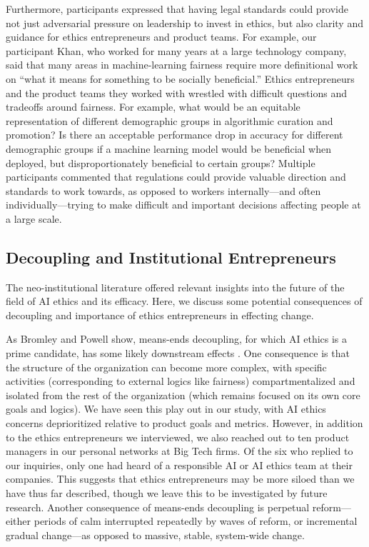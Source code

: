 \documentclass[sigconf]{acmart}
\begin{document}
Furthermore, participants expressed that having legal standards could provide not just adversarial pressure on leadership to invest in ethics, but also clarity and guidance for ethics entrepreneurs and product teams. For example, our participant Khan, who worked for many years at a large technology company, said that many areas in machine-learning fairness require more definitional work on “what it means for something to be socially beneficial.” Ethics entrepreneurs and the product teams they worked with wrestled with difficult questions and tradeoffs around fairness. For example, what would be an equitable representation of different demographic groups in algorithmic curation and promotion? Is there an acceptable performance drop in accuracy for different demographic groups if a machine learning model would be beneficial when deployed, but disproportionately beneficial to certain groups? Multiple participants commented that regulations could provide valuable direction and standards to work towards, as opposed to workers internally—and often individually—trying to make difficult and important decisions affecting people at a large scale.


\subsection{Decoupling and Institutional Entrepreneurs}

The neo-institutional literature offered relevant insights into the future of the field of AI ethics and its efficacy. Here, we discuss some potential consequences of decoupling and importance of ethics entrepreneurs in effecting change.

As Bromley and Powell show, means-ends decoupling, for which AI ethics is a prime candidate, has some likely downstream effects \cite{bromley_smoke_2012}. One consequence is that the structure of the organization can become more complex, with specific activities (corresponding to external logics like fairness) compartmentalized and isolated from the rest of the organization (which remains focused on its own core goals and logics). We have seen this play out in our study, with AI ethics concerns deprioritized relative to product goals and metrics. However, in addition to the ethics entrepreneurs we interviewed, we also reached out to ten product managers in our personal networks at Big Tech firms. Of the six who replied to our inquiries, only one had heard of a responsible AI or AI ethics team at their companies. This suggests that ethics entrepreneurs may be more siloed than we have thus far described, though we leave this to be investigated by future research. Another consequence of means-ends decoupling is perpetual reform---either periods of calm interrupted repeatedly by waves of reform, or incremental gradual change---as opposed to massive, stable, system-wide change.
\end{document}
